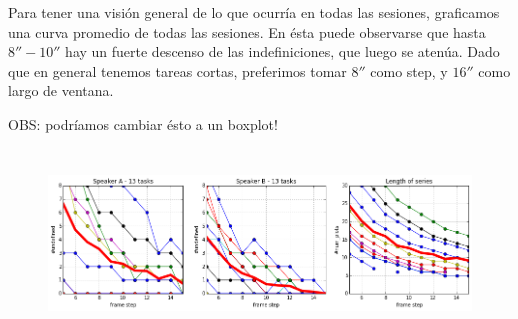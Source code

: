 Para tener una visión general de lo que ocurría en todas las sesiones, graficamos una curva promedio de todas las sesiones. En ésta puede observarse que hasta $8''-10''$ hay un fuerte descenso de las indefiniciones, que luego se atenúa. Dado que en general tenemos tareas cortas, preferimos tomar $8''$ como step, y $16''$ como largo de ventana.

OBS: podríamos cambiar ésto a un boxplot!

\begin{figure}
\centering
\includegraphics[height=5cm]{images/window_selection_for_session.png}
\end{figure}
